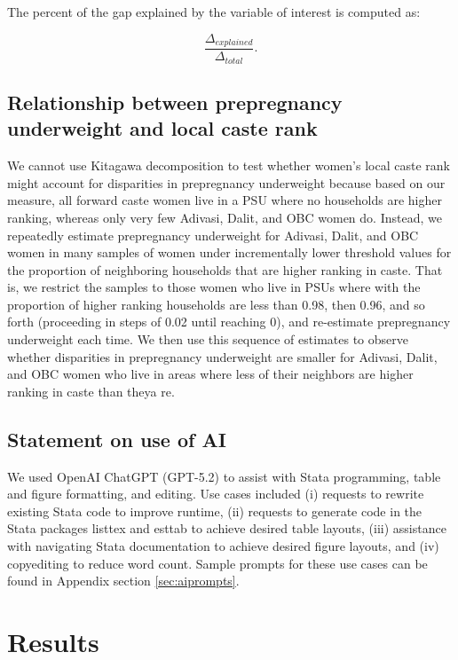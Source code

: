 \documentclass[12pt]{article}
\begin{document}
The percent of the gap explained by the variable of interest is computed as:

\begin{equation} \label{eq_pct}
    \frac{\Delta_{explained}}{\Delta_{total}}.
\end{equation}


\subsection{Relationship between prepregnancy underweight and local caste rank}

We cannot use Kitagawa decomposition to test whether women's local caste rank might account for disparities in prepregnancy underweight because based on our measure, all forward caste women live in a PSU where no households are higher ranking, whereas only very few Adivasi, Dalit, and OBC women do. Instead, we repeatedly estimate prepregnancy underweight for Adivasi, Dalit, and OBC women in many samples of women under incrementally lower threshold values for the proportion of neighboring households that are higher ranking in caste. That is, we restrict the samples to those women who live in PSUs where with the proportion of higher ranking households are less than 0.98, then 0.96, and so forth (proceeding in steps of 0.02 until reaching 0), and re-estimate prepregnancy underweight each time. We then use this sequence of estimates to observe whether disparities in prepregnancy underweight are smaller for Adivasi, Dalit, and OBC women who live in areas where less of their neighbors are higher ranking in caste than theya re. 



\subsection{Statement on use of AI}\label{sec:AIuse}

We used OpenAI ChatGPT (GPT-5.2) to assist with Stata programming, table and figure formatting, and editing. Use cases included (i) requests to rewrite existing Stata code to improve runtime, (ii) requests to generate code in the Stata packages listtex and esttab to achieve desired table layouts, (iii) assistance with navigating Stata documentation to achieve desired figure layouts, and (iv) copyediting to reduce word count.  Sample prompts for these use cases can be found in Appendix section \ref{sec:aiprompts}.

\section{Results}
\end{document}
